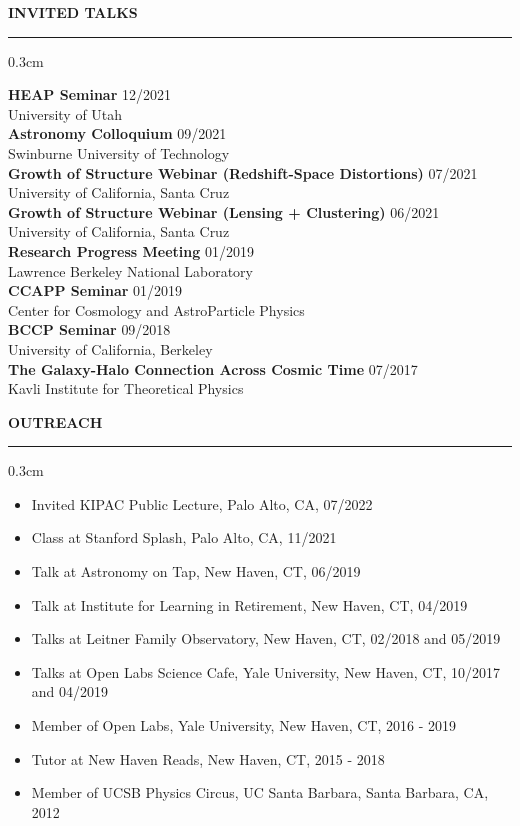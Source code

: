 \documentclass[11pt]{article}
\renewenvironment{section}[1]
  {
  \medskip
  {\color{yaleblue} \MakeUppercase{\bf #1}}
  \smallskip
  \hrule
  \medskip
  \begin{adjustwidth}{0.3cm}{}
  }
  {
  \end{adjustwidth}
  }
\newcommand{\entry}[3]{{\bf #1} \hfill {#2} \\ {#3}}
\begin{document}
\begin{section}{Invited Talks}
  \entry{HEAP Seminar}{12/2021}{University of Utah} \medskip \\
  \entry{Astronomy Colloquium}{09/2021}{Swinburne University of Technology} \medskip \\
  \entry{Growth of Structure Webinar (Redshift-Space Distortions)}{07/2021}{University of California, Santa Cruz} \medskip \\
  \entry{Growth of Structure Webinar (Lensing + Clustering)}{06/2021}{University of California, Santa Cruz} \medskip \\
  \entry{Research Progress Meeting}{01/2019}{Lawrence Berkeley National Laboratory} \medskip \\
  \entry{CCAPP Seminar}{01/2019}{Center for Cosmology and AstroParticle Physics} \medskip \\
  \entry{BCCP Seminar}{09/2018}{University of California, Berkeley} \medskip \\
  \entry{The Galaxy-Halo Connection Across Cosmic Time}{07/2017}{Kavli Institute for Theoretical Physics}
\end{section}

\begin{section}{Outreach}
  \begin{itemize}[leftmargin=0.5cm, topsep=0pt, itemsep=0pt, partopsep=0pt, parsep=0pt]
    \item Invited KIPAC Public Lecture, Palo Alto, CA, 07/2022
    \item Class at Stanford Splash, Palo Alto, CA, 11/2021
    \item Talk at Astronomy on Tap, New Haven, CT, 06/2019
    \item Talk at Institute for Learning in Retirement, New Haven, CT, 04/2019
    \item Talks at Leitner Family Observatory, New Haven, CT, 02/2018 and 05/2019
    \item Talks at Open Labs Science Cafe, Yale University, New Haven, CT, 10/2017 and 04/2019
    \item Member of Open Labs, Yale University, New Haven, CT, 2016 - 2019
    \item Tutor at New Haven Reads, New Haven, CT, 2015 - 2018
    \item Member of UCSB Physics Circus, UC Santa Barbara, Santa Barbara, CA, 2012
  \end{itemize}
\end{section}
\end{document}
